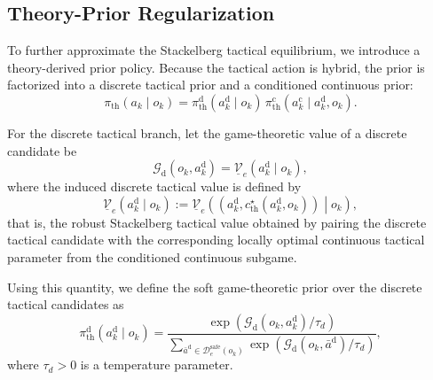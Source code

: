 \documentclass[final ,3p, times]{elsarticle}
\begin{document}
\subsection{Theory-Prior Regularization}
\label{subsec:theory_prior_regularization}

To further approximate the Stackelberg tactical equilibrium, we introduce a theory-derived prior policy. Because the tactical action is hybrid, the prior is factorized into a discrete tactical prior and a conditioned continuous prior:
\begin{equation}
\pi_{\mathrm{th}}(a_k\mid o_k)
=
\pi_{\mathrm{th}}^{\mathrm{d}}(a_k^{\mathrm{d}}\mid o_k)\,
\pi_{\mathrm{th}}^{\mathrm{c}}(a_k^{\mathrm{c}}\mid a_k^{\mathrm{d}},o_k).
\label{eq:theory_prior}
\end{equation}


For the discrete tactical branch, let the game-theoretic value of a discrete candidate be
\begin{equation}
\mathcal{G}_{\mathrm{d}}(o_k,a_k^{\mathrm{d}})
=
\underline{\mathcal{V}}_e(a_k^{\mathrm{d}}\mid o_k),
\label{eq:game_value_function}
\end{equation}
where the induced discrete tactical value is defined by
\begin{equation}
\underline{\mathcal{V}}_e(a_k^{\mathrm{d}}\mid o_k)
:=
\underline{\mathcal{V}}_e\!\left(
\left(a_k^{\mathrm{d}},c_{\mathrm{th}}^\star(a_k^{\mathrm{d}},o_k)\right)
\middle| o_k
\right),
\label{eq:discrete_induced_value}
\end{equation}
that is, the robust Stackelberg tactical value obtained by pairing the discrete tactical candidate with the corresponding locally optimal continuous tactical parameter from the conditioned continuous subgame.


Using this quantity, we define the soft game-theoretic prior over the discrete tactical candidates as
\begin{equation}
\pi_{\mathrm{th}}^{\mathrm{d}}(a_k^{\mathrm{d}}\mid o_k)
=
\frac{
\exp\!\left(\mathcal{G}_{\mathrm{d}}(o_k,a_k^{\mathrm{d}})/\tau_d\right)
}{
\sum\limits_{\bar a^{\mathrm{d}} \in \mathcal{D}_e^{\mathrm{safe}}(o_k)}
\exp\!\left(\mathcal{G}_{\mathrm{d}}(o_k,\bar a^{\mathrm{d}})/\tau_d\right)
},
\label{eq:discrete_theory_prior}
\end{equation}
where $\tau_d>0$ is a temperature parameter.
\end{document}
